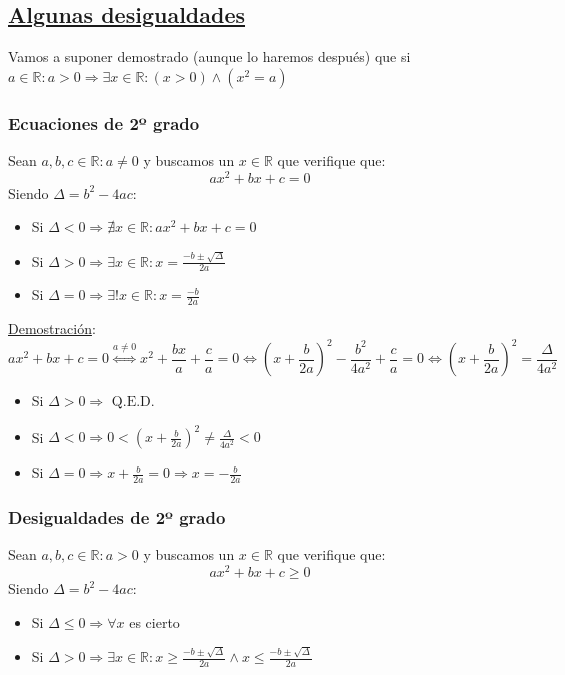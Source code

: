 \documentclass[10pt,a4paper,openright]{book}
\begin{document}
\subsection*{\underline{Algunas desigualdades}}
Vamos a suponer demostrado (aunque lo haremos después) que si $a\in \mathbb R : a>0\Rightarrow \exists x\in \mathbb R : (x>0)\wedge (x^2=a)$
\subsubsection*{Ecuaciones de 2º grado}
Sean $a,b,c\in \mathbb R  : a\neq 0$ y buscamos un $x\in \mathbb R$ que verifique que:
$$ax^2+bx+c=0$$
Siendo $\Delta=b^2-4ac$:
\begin{itemize}
\item Si $\Delta<0\Rightarrow \nexists x\in \mathbb R : ax^2+bx+c=0$
\item Si $\Delta>0 \Rightarrow \exists x\in \mathbb R : x=\frac{-b\pm\sqrt{\Delta}}{2a}$
\item Si $\Delta=0 \Rightarrow \exists! x\in \mathbb R : x=\frac{-b}{2a}$
\end{itemize}

\underline{Demostración}:
$$ax^2+bx+c=0\stackrel{a\neq 0}{\Leftrightarrow} x^2+\frac{bx}{a}+\frac{c}{a}=0\Leftrightarrow (x+\frac{b}{2a})^2-\frac{b^2}{4a^2}+\frac{c}{a}=0\Leftrightarrow (x+\frac{b}{2a})^2=\frac{\Delta}{4a^2}$$
\begin{itemize}
\item Si $\Delta>0\Rightarrow \mbox{ Q.E.D.}$
\item Si $\Delta<0\Rightarrow 0<(x+\frac{b}{2a})^2 \neq \frac{\Delta}{4a^2}<0$
\item Si $\Delta=0\Rightarrow x+\frac{b}{2a}=0\Rightarrow x=-\frac{b}{2a}$
\end{itemize}

\subsubsection*{Desigualdades de 2º grado}
Sean $a,b,c\in \mathbb R  : a>0$ y buscamos un $x\in \mathbb R$ que verifique que:
$$ax^2+bx+c\geq 0$$
Siendo $\Delta=b^2-4ac$:
\begin{itemize}
\item Si $\Delta\leq 0\Rightarrow \forall x$ es cierto
\item Si $\Delta>0 \Rightarrow \exists x \in \mathbb R : x\geq \frac{-b\pm\sqrt{\Delta}}{2a} \wedge x\leq \frac{-b\pm\sqrt{\Delta}}{2a}$
\end{itemize}
\end{document}

